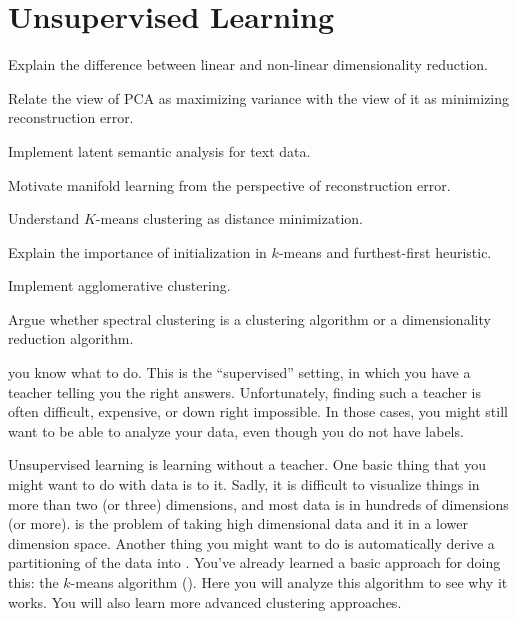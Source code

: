 \chapter{Unsupervised Learning} \label{sec:unsup}

\chapterquote{}{}

\begin{learningobjectives}
\item Explain the difference between linear and non-linear
  dimensionality reduction.
\item Relate the view of PCA as maximizing variance with the view of
  it as minimizing reconstruction error.
\item Implement latent semantic analysis for text data.
\item Motivate manifold learning from the perspective of
  reconstruction error.
\item Understand $K$-means clustering as distance minimization.
\item Explain the importance of initialization in $k$-means and
  furthest-first heuristic.
\item Implement agglomerative clustering.
\item Argue whether spectral clustering is a clustering algorithm or a
  dimensionality reduction algorithm.
\end{learningobjectives}

\dependencies{}

 you know
what to do.  This is the ``supervised'' setting, in which you have a
teacher telling you the right answers.  Unfortunately, finding such a
teacher is often difficult, expensive, or down right impossible.  In
those cases, you might still want to be able to analyze your data,
even though you do not have labels.

Unsupervised learning is learning without a teacher.  One basic thing
that you might want to do with data is to  it.
Sadly, it is difficult to visualize things in more than two (or three)
dimensions, and most data is in hundreds of dimensions (or more).
 is the
problem of taking high dimensional data and  it in
a lower dimension space.  Another thing you might want to do is
automatically derive a partitioning of the data into
.  You've already learned a basic
approach for doing this: the $k$-means algorithm ().
Here you will analyze this algorithm to see why it works.  You will
also learn more advanced clustering approaches.

